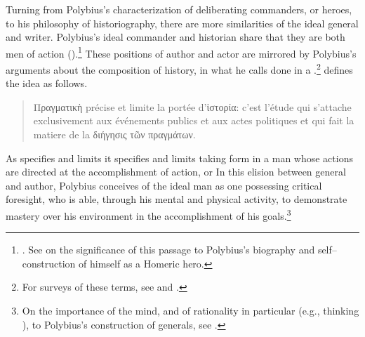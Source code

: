 \documentclass[12pt,letterpaper,oneside,final]{memoir}
\begin{document}
Turning from Polybius's characterization of deliberating commanders, or heroes, to his philosophy of historiography, there are more similarities of the ideal general and writer. Polybius's ideal commander and historian share that they are both men of action ().\footnote{. See \textcite[pp.~129--168, esp.~pp.~129--130]{mcging2010} on the significance of this passage to Polybius's biography and self--construction of himself as a Homeric hero.} These  positions of author and actor are mirrored by Polybius's arguments about the composition of history, in what he calls  done in a .\footnote{For surveys of these terms, see \textcite[21--32]{pedech1964} and \textcite[171--186]{sacks1981}.} \textcite{pedech1964} defines the idea as follows. \blockquote[{\cite[32]{pedech1964}}]{\textfrench{\textgreek{Πραγματικὴ} précise et limite la portée d'{\textgreek{ἱστορία:}} c'est l'étude qui s'attache exclusivement aux événements publics et aux actes politiques et qui fait la matiere de la \textgreek{διήγησις τῶν πραγμάτων}}.} As  specifies and limits  it specifies and limits  taking form in a man whose actions are directed at the accomplishment of action, or  In this elision between general and author, Polybius conceives of the ideal man as one possessing critical foresight, who is able, through his mental and physical activity, to demonstrate mastery over his environment in the accomplishment of his goals.\footnote{On the importance of the mind, and of rationality in particular (e.g., thinking  ), to Polybius's construction of generals, see \textcite[210--229]{pedech1964}.}
\end{document}
